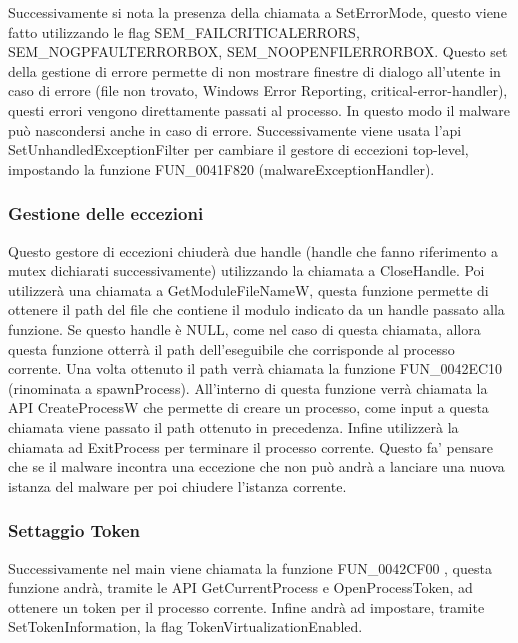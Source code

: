 \documentclass[a4paper,12pt]{article}
\begin{document}
Successivamente si nota la presenza della chiamata a SetErrorMode, questo viene fatto utilizzando le flag SEM\_FAILCRITICALERRORS,\\ SEM\_NOGPFAULTERRORBOX, SEM\_NOOPENFILERRORBOX. Questo set della gestione di errore permette di non mostrare finestre di dialogo all'utente in caso di errore (file non trovato, Windows Error Reporting, critical-error-handler), questi errori vengono direttamente passati al processo. In questo modo il malware può nascondersi anche in caso di errore. Successivamente viene usata l'api SetUnhandledExceptionFilter per cambiare il gestore di eccezioni top-level, impostando la funzione FUN\_0041F820 (malwareExceptionHandler). 

\subsubsection{Gestione delle eccezioni}
Questo gestore di eccezioni chiuderà due handle (handle che fanno riferimento a mutex dichiarati successivamente) utilizzando la chiamata a CloseHandle. Poi utilizzerà una chiamata a GetModuleFileNameW, questa funzione permette di ottenere il path del file che contiene il modulo indicato da un handle passato alla funzione. Se questo handle è NULL, come nel caso di questa chiamata, allora questa funzione otterrà il path dell'eseguibile che corrisponde al processo corrente. Una volta ottenuto il path verrà chiamata la funzione FUN\_0042EC10 (rinominata a spawnProcess). All'interno di questa funzione verrà chiamata la API CreateProcessW che permette di creare un processo, come input a questa chiamata viene passato il path ottenuto in precedenza. Infine utilizzerà la chiamata ad ExitProcess per terminare il processo corrente. Questo fa' pensare che se il malware incontra una eccezione che non può andrà a lanciare una nuova istanza del malware per poi chiudere l'istanza corrente.

\subsubsection{Settaggio Token}
Successivamente nel main viene chiamata la funzione FUN\_0042CF00 , questa funzione andrà, tramite le API GetCurrentProcess e OpenProcessToken, ad ottenere un token per il processo corrente. Infine andrà ad impostare, tramite SetTokenInformation, la flag TokenVirtualizationEnabled.
\end{document}
